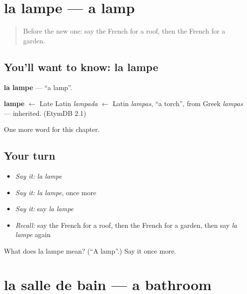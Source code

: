 \section[la lampe]{la lampe — a lamp}

\label{lesson:FR-C74-lampe}



\begin{quote}
Before the new one: say the French for a roof, then the French for a garden.
\end{quote}

\subsection*{You'll want to know: la lampe}
\textbf{la lampe} — \textquotedblleft{}a lamp\textquotedblright{}.

\begin{cousinweb}
\textbf{lampe} $\leftarrow$ Late Latin \emph{lampada} $\leftarrow$ Latin \emph{lampas}, \textquotedblleft{}a torch\textquotedblright{}, from Greek \emph{lampas} — inherited. (EtymDB 2.1)
\end{cousinweb}

\begin{grammarlens}[title={What you've built}]
One more word for this chapter.
\end{grammarlens}

\subsection*{Your turn}
\begin{itemize}
\raggedright
  \item \emph{Say it:} \emph{la lampe}
  \item \emph{Say it:} \emph{la lampe}, once more
  \item \emph{Say it:} say \emph{la lampe}
  \item \emph{Recall:} say the French for a roof, then the French for a garden, then say \emph{la lampe} again
\end{itemize}

\begin{tcolorbox}[breakable,colback=teal!4,colframe=teal!35!black,title={Before you move on}]
What does la lampe mean? (\textquotedblleft{}A lamp\textquotedblright{}.) Say it once more.
\end{tcolorbox}
\section[la salle de bain]{la salle de bain — a bathroom}

